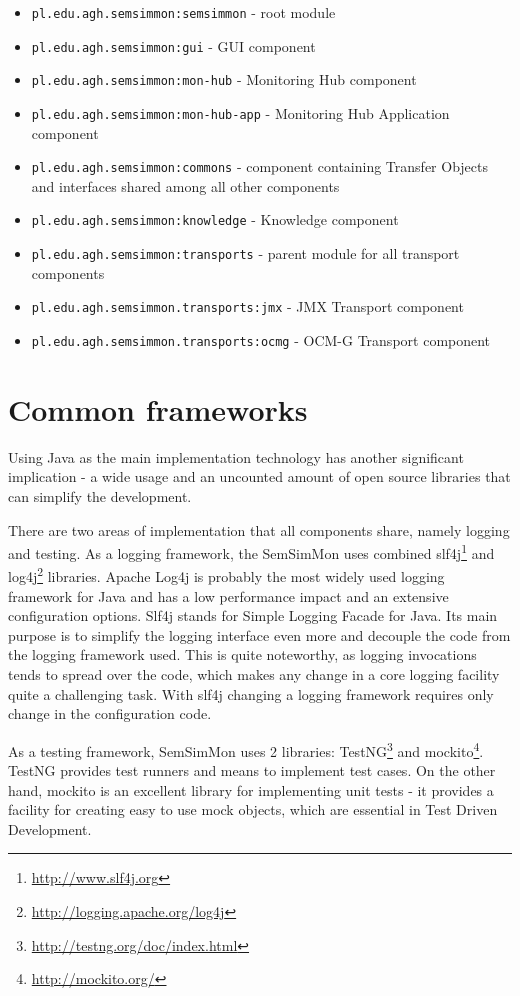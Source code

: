 \begin{itemize}
\item \texttt{pl.edu.agh.semsimmon:semsimmon} - root module
\item \texttt{pl.edu.agh.semsimmon:gui} - GUI component
\item \texttt{pl.edu.agh.semsimmon:mon-hub} - Monitoring Hub component
\item \texttt{pl.edu.agh.semsimmon:mon-hub-app} - Monitoring Hub Application component 
\item \texttt{pl.edu.agh.semsimmon:commons} - component containing Transfer Objects and interfaces shared among all other components
\item \texttt{pl.edu.agh.semsimmon:knowledge} - Knowledge component
\item \texttt{pl.edu.agh.semsimmon:transports} - parent module for all transport components
\item \texttt{pl.edu.agh.semsimmon.transports:jmx} - JMX Transport component
\item \texttt{pl.edu.agh.semsimmon.transports:ocmg} - OCM-G Transport component
\end{itemize}

\section{Common frameworks}

Using Java as the main implementation technology has another significant implication - a wide usage and an uncounted amount of open source libraries that can simplify the development.

There are two areas of implementation that all components share, namely logging and testing. As a logging framework, the SemSimMon uses combined slf4j\footnote{\url{http://www.slf4j.org}} and log4j\footnote{\url{http://logging.apache.org/log4j}} libraries. Apache Log4j is probably the most widely used logging framework for Java and has a low performance impact and an extensive configuration options. Slf4j stands for Simple Logging Facade for Java. Its main purpose is to simplify the logging interface even more and decouple the code from the logging framework used. This is quite noteworthy, as logging invocations tends to spread over the code, which makes any change in a core logging facility quite a challenging task. With slf4j changing a logging framework requires only change in the configuration code.

As a testing framework, SemSimMon uses 2 libraries: TestNG\footnote{\url{http://testng.org/doc/index.html}} and mockito\footnote{\url{http://mockito.org/}}. TestNG provides test runners and means to implement test cases. On the other hand, mockito is an excellent library for implementing unit tests - it provides a facility for creating easy to use mock objects, which are essential in Test Driven Development.





